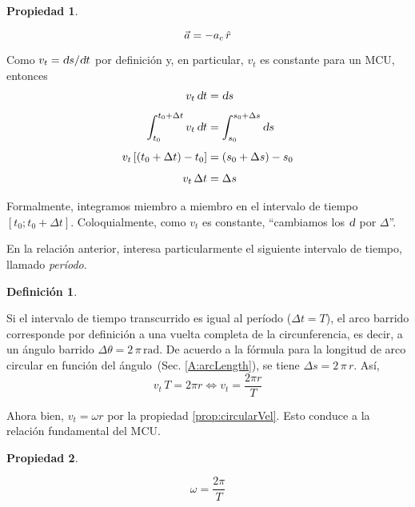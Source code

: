 \documentclass[a5paper,12pt,twoside]{book}
\newtheorem{defn}{{Definición}}[chapter]
\newtheorem{prop}{{Propiedad}}[chapter]
\begin{document}
\begin{mdframed}[style=MyFrame1]
    \begin{prop}
    \end{prop}
    \begin{equation*}
        \Vec{a} = - a_c \, \hat{r}
    \end{equation*}
\end{mdframed}

Como $v_t = \textsl{d} s / \textsl{d} t$ por definición y, en particular, $v_t$ es constante para un MCU, entonces
\begin{align*}
    v_t \, \textsl{d} t &= \textsl{d} s
    \\[1ex]
    \int_{t_0}^{t_0+\Delta t} v_t \, \textsl{d} t &= \int_{s_0}^{s_0+\Delta s} \textsl{d} s
    \\[1ex]
    v_t \left[\left( t_0+\Delta t \right) - t_0\right] &= \left( s_0+\Delta s \right) - s_0
    \\[1ex]
    v_t \, \Delta t &= \Delta s
\end{align*}

Formalmente, integramos miembro a miembro en el intervalo de tiempo $\left[ t_0; t_0 + \Delta t \right]$.
Coloquialmente, como $v_t$ es constante, ``cambiamos los $\textsl{d}$ por $\Delta$''.

En la relación anterior, interesa particularmente el siguiente intervalo de tiempo, llamado \emph{período}.

\begin{mdframed}[style=MyFrame1]
    \begin{defn}
    \end{defn}
\end{mdframed}

Si el intervalo de tiempo transcurrido es igual al período ($\Delta t = T$), el arco barrido corresponde por definición a una vuelta completa de la circunferencia, es decir, a un ángulo barrido $\Delta \theta = 2 \, \pi \, \si{\radian}$.
De acuerdo a la fórmula para la longitud de arco circular en función del ángulo~(Sec. \ref{A:arcLength}), se tiene $\Delta s = 2 \, \pi \, r$.
Así,
\[ v_t \, T = 2 \pi r \iff v_t = \frac{2 \pi r}{T} \]

Ahora bien, $v_t = \omega r$ por la propiedad \ref{prop:circularVel}.
Esto conduce a la relación fundamental del MCU.

\begin{mdframed}[style=MyFrame1]
    \begin{prop}
        \label{prop:period}
    \end{prop}
    \begin{equation*}
        \omega = \frac{2 \pi}{T}
    \end{equation*}
\end{mdframed}
\end{document}
